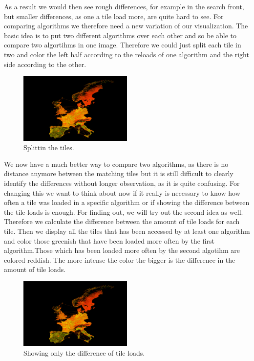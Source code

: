 \documentclass
[
	paper = a4,
    pagesize,
	12 pt,
	oneside,                       %
    open = right,
	DIV = calc,
	BCOR = 0 mm,                   %
	bibtotoc
]
{scrbook}
\begin{document}
As a result we would then see rough differences, for example in the search front, but smaller differences, as one a tile load more, are quite hard to see.
For comparing algorithms we therefore need  a new variation of our visualization.
The basic idea is to put two different algorithms over each other and so be able to compare two algortihms in one image.
Therefore we could just split each tile in two and color the left half according to the reloads of one algorithm and the right side according to the other.

\begin{figure}[H]
	\includegraphics[width=0.5\textwidth]{Images/placeholder.png}
\caption[]{Splittin the tiles.}
\label{fig:splitted tiles}
\end{figure}


We now have a much better way to compare two algorithms, as there is no distance anymore between the matching tiles but it is still difficult to clearly identify the differences without longer observation, as it is quite confusing.
For changing this we want to think about now if it really is  necessary to know how often a tile was loaded in a specific algorithm or if showing the difference between the tile-loads is enough.
For finding out, we will try out the second idea as well.
Therefore we calculate the difference between the amount of tile loads for each tile.
Then we display all the tiles that has been accessed by at least one algorithm and color those greenish that have been loaded more often by the first algorithm.Those which has been loaded more often by the second algotihm are colored reddish.
The more intense the color the bigger is the difference in the amount of tile loads.

\begin{figure}[H]
	\includegraphics[width=0.5\textwidth]{Images/placeholder.png}
\caption[]{Showing only the difference of tile loads.}
\label{fig:splitted tiles}
\end{figure}
\end{document}

